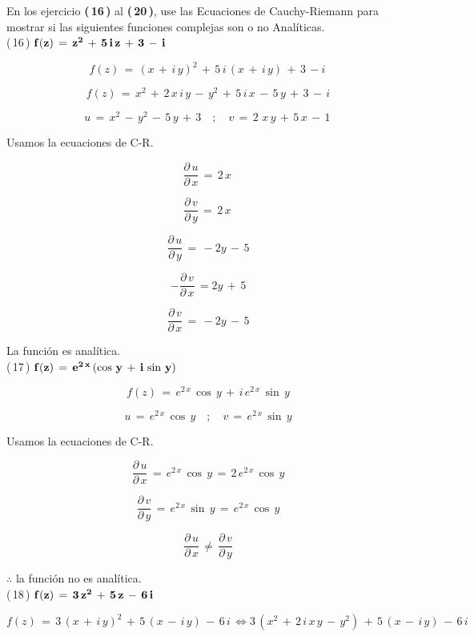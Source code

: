 \documentclass[a4paper,11pt,openany]{book}
\begin{document}
En los ejercicio \textbf{(\,16\,)} al \textbf{(\,20\,)}, use las Ecuaciones de Cauchy-Riemann para mostrar si las siguientes funciones complejas son o no Analíticas.\\

\textcolor{ao(english)}{(\,16\,)} $\bf{f(z)\,=\,z^{2}\,+\,5\,i\,z\,+\,3\,-\,i}$

$$f(z)\,=\,(x\,+\,i\,y)^{2}\,+\,5\,i\,(x\,+\,i\,y)\,+\,3\,-i\,$$  

$$f(z)\,= \,x^{2}\,+\,2\,x\,i\,y\,-\,y^{2}\,+\,5\,i\,x\,-\,5\,y\,+\,3\,-\,i$$

$$u\,=\,x^{2}\,-\,y^{2}\,-\,5\,y\,+\,3 \quad;\quad v\,=\,2\,\,x\,y\,+\,5\,x\,-\,1\,$$

\textcolor{ao(english)}{} Usamos la ecuaciones de C-R.

$$\dfrac{\partial\,u}{\partial\,x}\,=\,2\,x\,$$

$$\dfrac{\partial\,v}{\partial\,y}\,=\,2\,x\,$$

$$\dfrac{\partial\,u}{\partial\,y}\,=\,-2y\,-\,5$$

$$-\dfrac{\partial\,v}{\partial\,x}\,=2y\,+\,5$$

$$\dfrac{\partial\,v}{\partial\,x}\,=\,-2y\,-\,5$$

La función es analítica.\\

\textcolor{ao(english)}{(\,17\,)} $\bf{f(z)\,=\,e^{2\,x}\,(\cos\,y\,+\,i\,\sin\,y)}$

$$f(z)\,=\,e^{2\,x}\,\cos\,y\,+\,i\,e^{2\,x}\,\sin\,y$$

$$u\,=\,e^{2\,x}\,\cos\,y \quad;\quad v\,=\,e^{2\,x}\,\sin\,y$$

\newpage

\textcolor{ao(english)}{} Usamos la ecuaciones de C-R.

$$\dfrac{\partial\,u}{\partial\,x}\,=\,e^{2\,x}\,\cos\,y\,=\,2\,e^{2\,x}\,\cos\,y$$

$$\dfrac{\partial\,v}{\partial\,y}\,=\,e^{2\,x}\,\sin\,y\,=\,e^{2\,x}\,\cos\,y$$

$$\dfrac{\partial\,u}{\partial\,x}\,\neq\,\dfrac{\partial\,v}{\partial\,y}$$

$\therefore$ la función no es analítica.\\

\textcolor{ao(english)}{(\,18\,)} $\bf{f(z)\,=\,3\,z^{2}\,+\,5\,z\,-\,6\,i}$

$$f(z)\,=\,3\,(x\,+\,i\,y)^{2}\,+\,5\,(x\,-\,i\,y)\,-\,6\,i\,\iff 3\,(x^{2}\,+\,2\,i\,x\,y\,-\,y^{2})\,+\,5\,(x\,-\,i\,y)\,-\,6\,i\, $$  
\end{document}
